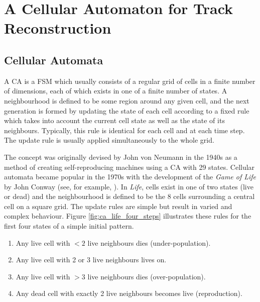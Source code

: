 \chapter{A Cellular Automaton for Track Reconstruction}

\section{Cellular Automata}
A \ac{CA} is a \ac{FSM} which usually consists of a regular grid of cells in a finite number of dimensions, each of which exists in one of a finite number of states. A neighbourhood is defined to be some region around any given cell, and the next generation is formed by updating the state of each cell according to a fixed rule which takes into account the current cell state as well as the state of its neighbours. Typically, this rule is identical for each cell and at each time step. The update rule is usually applied simultaneously to the whole grid.

The concept was originally devised by John von Neumann\citep{vonNeumann1966} in the 1940s as a method of creating self-reproducing machines using a \ac{CA} with 29 states. Cellular automata became popular in the 1970s with the development of the \emph{Game of Life} by John Conway (see, for example, \citep{Gardner1970}). In \emph{Life}, cells exist in one of two states (live or dead) and the neighbourhood is defined to be the 8 cells surrounding a central cell on a square grid. The update rules are simple but result in varied and complex behaviour. Figure \ref{fig:ca_life_four_steps} illustrates these rules for the first four states of a simple initial pattern.

\begin{enumerate}
\item Any live cell with $< 2$ live neighbours dies (under-population).
\item Any live cell with 2 or 3 live neighbours lives on.
\item Any live cell with $> 3$ live neighbours dies (over-population).
\item Any dead cell with exactly 2 live neighbours becomes live (reproduction).
\end{enumerate}

